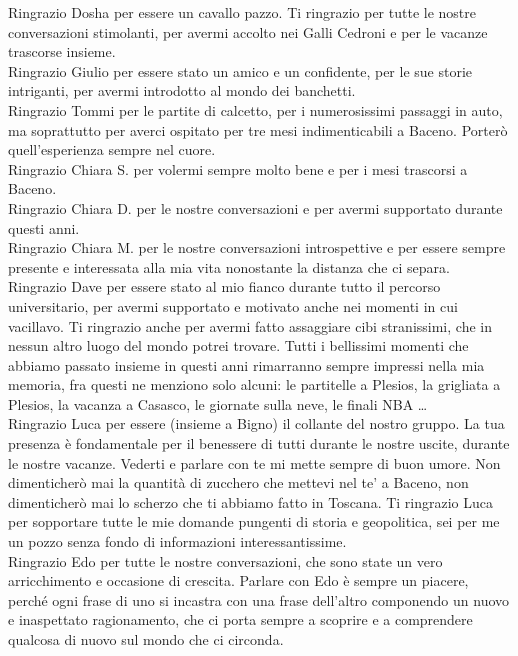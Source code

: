 Ringrazio Dosha per essere un cavallo pazzo. Ti ringrazio per tutte le nostre conversazioni stimolanti, per 
avermi accolto nei Galli Cedroni e per le vacanze trascorse insieme.\\
Ringrazio Giulio per essere stato un amico e un confidente, per le sue storie intriganti, per avermi introdotto 
al mondo dei banchetti.\\
Ringrazio Tommi per le partite di calcetto, per i numerosissimi passaggi in auto, ma soprattutto per averci 
ospitato per tre mesi indimenticabili a Baceno.
Porterò quell’esperienza sempre nel cuore.\\
Ringrazio Chiara S. per volermi sempre molto bene e per i mesi trascorsi a Baceno.\\
Ringrazio Chiara D. per le nostre conversazioni e per avermi supportato durante questi anni.\\
Ringrazio Chiara M. per le nostre conversazioni introspettive e per essere sempre presente e interessata alla mia 
vita nonostante la distanza che ci separa.\\
Ringrazio Dave per essere stato al mio fianco durante tutto il percorso universitario, per avermi supportato 
e motivato anche nei momenti in cui vacillavo. Ti ringrazio anche per avermi fatto assaggiare cibi stranissimi, 
che in nessun altro luogo del mondo potrei trovare. Tutti i bellissimi momenti che abbiamo passato insieme in 
questi anni rimarranno sempre impressi nella mia memoria, fra questi ne menziono solo alcuni: le partitelle a 
Plesios, la grigliata a Plesios, la vacanza a Casasco, le giornate sulla neve, le finali NBA …\\
Ringrazio Luca per essere (insieme a Bigno) il collante del nostro gruppo. La tua presenza è fondamentale per 
il benessere di tutti durante le nostre uscite, durante le nostre vacanze. Vederti e parlare con te mi mette 
sempre di buon umore. Non dimenticherò mai la quantità di zucchero che mettevi nel te’ a Baceno, non dimenticherò 
mai lo scherzo che ti abbiamo fatto in Toscana. Ti ringrazio Luca per sopportare tutte le mie domande pungenti di 
storia e geopolitica, sei per me un pozzo senza fondo di informazioni interessantissime.\\
Ringrazio Edo per tutte le nostre conversazioni, che sono state un vero arricchimento e occasione di crescita.
Parlare con Edo è sempre un piacere, perché ogni frase di uno si incastra con una frase dell’altro componendo un 
nuovo e inaspettato ragionamento, che ci porta sempre a scoprire e a comprendere qualcosa di nuovo sul mondo che ci circonda. 

